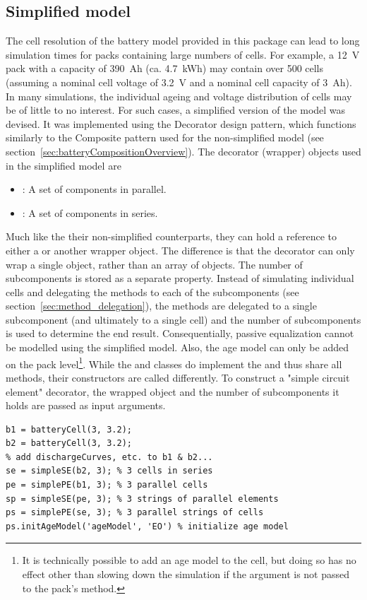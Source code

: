 \subsection{Simplified model}
The cell resolution of the battery model provided in this package can lead to long simulation times for packs containing large numbers of cells. For example, a 12~V pack with a capacity of 390~Ah (ca. 4.7~kWh) may contain over 500 cells (assuming a nominal cell voltage of 3.2~V and a nominal cell capacity of 3~Ah). In many simulations, the individual ageing and voltage distribution of cells may be of little to no interest. For such cases, a simplified version of the model was devised. It was implemented using the Decorator design pattern, which functions similarly to the Composite pattern used for the non-simplified model (see section~\ref{sec:batteryCompositionOverview}). The decorator (wrapper) objects used in the simplified model are
\begin{itemize}
	\item {}: A set of components in parallel.
	\item {}: A set of components in series.
\end{itemize}
Much like the their non-simplified counterparts, they can hold a reference to either a  or another wrapper object. The difference is that the decorator can only wrap a single object, rather than an array of objects. The number of subcomponents is stored as a separate property. Instead of simulating individual cells and delegating the methods to each of the subcomponents (see section~\ref{sec:method_delegation}), the methods are delegated to a single subcomponent (and ultimately to a single cell) and the number of subcomponents is used to determine the end result. Consequentially, passive equalization cannot be modelled using the simplified model. Also, the age model can only be added on the pack level\footnote{It is technically possible to add an age model to the cell, but doing so has no effect other than slowing down the simulation if the  argument is not passed to the pack's  method.}. While the  and  classes do implement the  and thus share all methods, their constructors are called differently. To construct a "simple circuit element" decorator, the wrapped object and the number of subcomponents it holds are passed as input arguments.
\begin{lstlisting}
b1 = batteryCell(3, 3.2);
b2 = batteryCell(3, 3.2);
% add dischargeCurves, etc. to b1 & b2...
se = simpleSE(b2, 3); % 3 cells in series
pe = simplePE(b1, 3); % 3 parallel cells
sp = simpleSE(pe, 3); % 3 strings of parallel elements
ps = simplePE(se, 3); % 3 parallel strings of cells
ps.initAgeModel('ageModel', 'EO') % initialize age model
\end{lstlisting}


